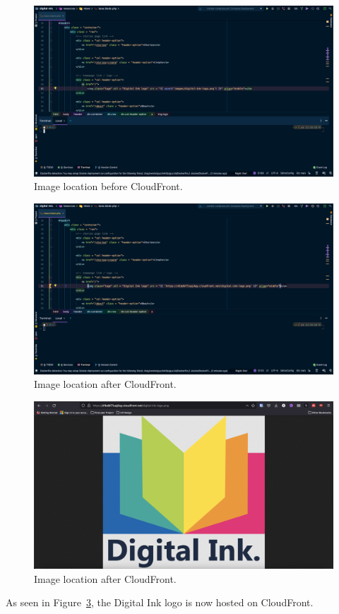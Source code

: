 \begin{figure}[!htbp]
    \centering
    \includegraphics[width=\textwidth]{resources/cloudfront/cloudfront-before}
    \caption{Image location before CloudFront.}
    \label{fig:cloudfront-before}
\end{figure}

\begin{figure}[!htbp]
    \centering
    \includegraphics[width=\textwidth]{resources/cloudfront/cloudfront-after}
    \caption{Image location after CloudFront.}
    \label{fig:cloudfront-after}
\end{figure}

\begin{figure}[!htbp]
    \centering
    \includegraphics[width=\textwidth]{resources/cloudfront/cloudfront-website}
    \caption{Image location after CloudFront.}
    \label{fig:cloudfront-website}
\end{figure}

As seen in Figure~\ref{fig:cloudfront-website}, the Digital Ink logo is now hosted on CloudFront.





